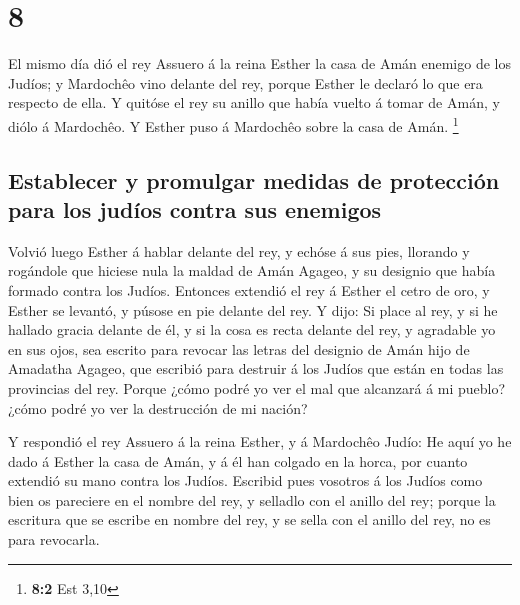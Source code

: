 \hypertarget{section-7}{%
\section{8}\label{section-7}}

 El mismo día dió el rey Assuero á la reina Esther la casa
de Amán enemigo de los Judíos; y Mardochêo vino delante del rey, porque
Esther le declaró lo que era respecto de ella.  Y quitóse el
rey su anillo que había vuelto á tomar de Amán, y diólo á Mardochêo. Y
Esther puso á Mardochêo sobre la casa de Amán. \footnote{\textbf{8:2}
  Est 3,10}

\hypertarget{establecer-y-promulgar-medidas-de-protecciuxf3n-para-los-juduxedos-contra-sus-enemigos}{%
\subsection{Establecer y promulgar medidas de protección para los judíos
contra sus
enemigos}\label{establecer-y-promulgar-medidas-de-protecciuxf3n-para-los-juduxedos-contra-sus-enemigos}}

 Volvió luego Esther á hablar delante del rey, y echóse á
sus pies, llorando y rogándole que hiciese nula la maldad de Amán
Agageo, y su designio que había formado contra los Judíos. 
Entonces extendió el rey á Esther el cetro de oro, y Esther se levantó,
y púsose en pie delante del rey.  Y dijo: Si place al rey, y
si he hallado gracia delante de él, y si la cosa es recta delante del
rey, y agradable yo en sus ojos, sea escrito para revocar las letras del
designio de Amán hijo de Amadatha Agageo, que escribió para destruir á
los Judíos que están en todas las provincias del rey. 
Porque ¿cómo podré yo ver el mal que alcanzará á mi pueblo? ¿cómo podré
yo ver la destrucción de mi nación?

 Y respondió el rey Assuero á la reina Esther, y á Mardochêo
Judío: He aquí yo he dado á Esther la casa de Amán, y á él han colgado
en la horca, por cuanto extendió su mano contra los Judíos. 
Escribid pues vosotros á los Judíos como bien os pareciere en el nombre
del rey, y selladlo con el anillo del rey; porque la escritura que se
escribe en nombre del rey, y se sella con el anillo del rey, no es para
revocarla.


